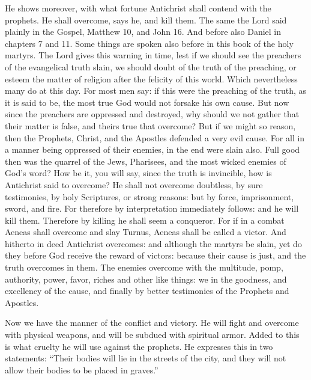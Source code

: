 He shows moreover, with what fortune Antichrist shall contend with the prophets. He shall overcome, says he, and kill them. The same the Lord said plainly in the Gospel, Matthew 10, and John 16. And before also Daniel in chapters 7 and 11. Some things are spoken also before in this book of the holy martyrs. The Lord gives this warning in time, lest if we should see the preachers of the evangelical truth slain, we should doubt of the truth of the preaching, or esteem the matter of religion after the felicity of this world. Which nevertheless many do at this day. For most men say: if this were the preaching of the truth, as it is said to be, the most true God would not forsake his own cause. But now since the preachers are oppressed and destroyed, why should we not gather that their matter is false, and theirs true that overcome? But if we might so reason, then the Prophets, Christ, and the Apostles defended a very evil cause. For all in a manner being oppressed of their enemies, in the end were slain also. Full good then was the quarrel of the Jews, Pharisees, and the most wicked enemies of God’s word? How be it, you will say, since the truth is invincible, how is Antichrist said to overcome? He shall not overcome doubtless, by sure testimonies, by holy Scriptures, or strong reasons: but by force, imprisonment, sword, and fire. For therefore by interpretation immediately follows: and he will kill them. Therefore by killing he shall seem a conqueror. For if in a combat Aeneas shall overcome and slay Turnus, Aeneas shall be called a victor. And hitherto in deed Antichrist overcomes: and although the martyrs be slain, yet do they before God receive the reward of victors: because their cause is just, and the truth overcomes in them. The enemies overcome with the multitude, pomp, authority, power, favor, riches and other like things: we in the goodness, and excellency of the cause, and finally by better testimonies of the Prophets and Apostles.

Now we have the manner of the conflict and victory. He will fight and overcome with physical weapons, and will be subdued with spiritual armor. Added to this is what cruelty he will use against the prophets. He expresses this in two statements: “Their bodies will lie in the streets of the city, and they will not allow their bodies to be placed in graves.”

